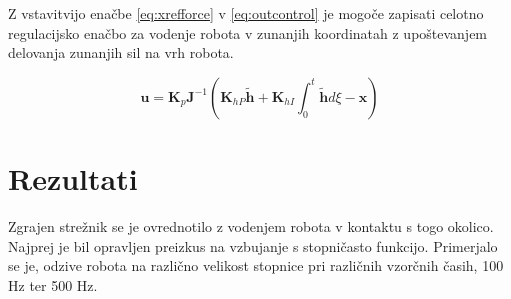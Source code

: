 \documentclass[a4paper]{article}
\begin{document}
Z vstavitvijo enačbe \ref{eq:xrefforce} v \ref{eq:outcontrol} je mogoče zapisati celotno regulacijsko enačbo za vodenje robota v zunanjih koordinatah z upoštevanjem delovanja zunanjih sil na vrh robota.

\begin{equation} \label{eq:admitcontrol}
\textbf{u} = \textbf{K}_p  \textbf{J}^{-1}(\textbf{K}_{hP}\tilde{\textbf{h}} + \textbf{K}_{hI} \int_{0}^{t}\tilde{\textbf{h}}d\xi - \textbf{x})
\end{equation}


\section{Rezultati}

Zgrajen strežnik se je ovrednotilo z vodenjem robota v kontaktu s togo okolico. Najprej je bil opravljen preizkus na vzbujanje s stopničasto funkcijo. Primerjalo se je, odzive robota na različno velikost stopnice pri različnih vzorčnih časih, 100 Hz ter 500 Hz.
\end{document}

